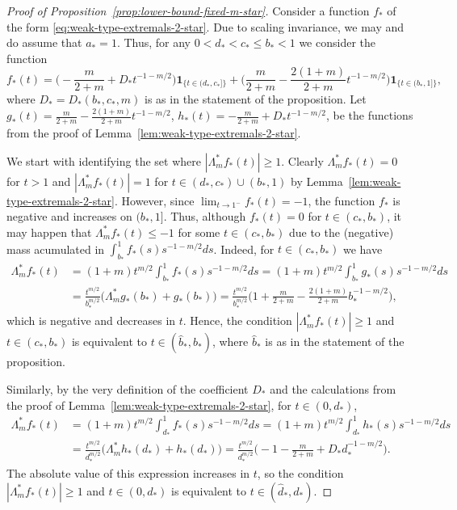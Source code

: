 \documentclass[a4paper]{amsart} %
\theoremstyle{definition}
\theoremstyle{remark}
\numberwithin{equation}{section}
\newcommand*{\ind}[1]{\mathbf{1}_{#1}}
\newcommand*{\indbr}[1]{\ind{\{#1\}}}
\newcommand*{\fStar}{f_{*}}
\newcommand*{\fZeroStar}{g_{*}}
\newcommand*{\fOneStar}{h_{*}}
\newcommand*{\aStar}{a_*}
\newcommand*{\bStar}{b_*}
\newcommand*{\cStar}{c_*}
\newcommand*{\dStar}{d_*}
\newcommand*{\dOneStar}{D_*}%
\newcommand*{\bGainStar}{\widehat{b}_*}
\newcommand*{\dGainStar}{\widehat{d}_*}
\begin{document}
\begin{proof}[Proof of Proposition~\ref{prop:lower-bound-fixed-m-star}]
	Consider a function  $f_*$ of the form \eqref{eq:weak-type-extremals-2-star}. 
	Due to scaling invariance,
	we may and do assume that $\aStar=1$.
	Thus, for  any $0 < \dStar < \cStar \leq \bStar  <1$ we consider the function
	\[
	\fStar(t) = \bigl( -\frac{m}{2+m} + \dOneStar t^{-1 -m/2}\bigr)\indbr{t\in (\dStar,\cStar]}
	+
	\bigl(\frac{m}{2+m} -\frac{2(1+m)}{2+m} t^{-1 -m/2}\bigr) \indbr{t\in (\bStar, 1]},
	\]
	where $	\dOneStar = \dOneStar(\bStar,\cStar,m)$ is as in the statement of the proposition.
	Let $\fZeroStar(t)=  \frac{m}{2+m} - \frac{2(1+m)}{2+m} t^{-1-m/2}$,
	$\fOneStar (t) =   -\frac{m}{2+m} + \dOneStar t^{-1 - m/2}$,
	be the functions from the proof of Lemma~\ref{lem:weak-type-extremals-2-star}.
	
	
	
	We start with identifying the set where $|\Lambda_m^* \fStar (t)| \geq 1$.
	Clearly
	$ \Lambda_m^* \fStar(t) =0$ for $t>1$ 
	and $|\Lambda_m^* \fStar(t)| = 1$ for $t\in (\dStar,\cStar) \cup (\bStar, 1)$
	by Lemma~\ref{lem:weak-type-extremals-2-star}.
	However, since $\lim_{t\to 1^-} \fStar(t) = -1 $,
	the function $\fStar$ is negative and increases on $(\bStar,1]$.
	Thus,
	although $\fStar(t) = 0$ for $t\in (\cStar,\bStar)$,
	it may happen that $\Lambda_m^* \fStar(t) \leq -1$ for some $t\in(\cStar,\bStar)$
	due to the (negative) mass acumulated in $\int_{\bStar}^1 \fStar(s) s^{-1-m/2} ds$.
	Indeed, for $t\in (\cStar,\bStar)$ we have
	\begin{align*}
	\Lambda_m^* \fStar(t)
	&= (1+m){t^{m/2}} \int_{\bStar}^1 \fStar(s) s^{-1-m/2}ds
	= (1+m){t^{m/2}} \int_{\bStar}^1 \fZeroStar(s) s^{-1-m/2}ds\\
	&= \frac{t^{m/2}}{\bStar^{m/2}} \bigl( \Lambda_m^* \fZeroStar(\bStar) + \fZeroStar(\bStar)\bigr)
	= \frac{t^{m/2}}{\bStar^{m/2}} \bigl( 1 + \frac{m}{2+m}  - \frac{2(1+m)}{2+m} \bStar^{-1-m/2}\bigr), 
	\end{align*}
	which is negative and decreases in $t$.
	Hence, the condition $|\Lambda_m^* \fStar(t)| \geq 1$ and $t\in(\cStar,\bStar)$ is equivalent to 
	$t\in(\bGainStar,\bStar)$, where $\bGainStar$ is as in the statement of the proposition.
	
	
	Similarly,  by the very definition of the coefficient $\dOneStar$ and the calculations from the proof of Lemma~\ref{lem:weak-type-extremals-2-star}, for $t\in(0,\dStar)$,
	\begin{align*}
	\Lambda_m^* \fStar(t)
	&= (1+m) t^{m/2} \int_{\dStar}^1 \fStar(s) s^{-1-m/2}ds
	= (1+m) t^{m/2} \int_{\dStar}^1 \fOneStar(s) s^{-1-m/2}ds\\
	&= \frac{t^{m/2}}{\dStar^{m/2}} \bigl( \Lambda_m^* \fOneStar(\dStar) + \fOneStar(\dStar)\bigr)
	= \frac{t^{m/2}}{\dStar^{m/2}} \bigl( -1 - \frac{m}{2+m}  + \dOneStar \dStar^{-1-m/2}\bigr).
	\end{align*}
	The absolute value of this expression increases in $t$,
	so the condition $|\Lambda_m^* \fStar(t)| \geq 1$ and $t\in(0,\dStar)$
	is equivalent to $t\in(\dGainStar, \dStar)$.
	

\end{proof}
\end{document}
